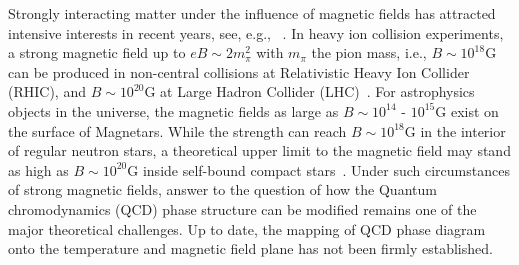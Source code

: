 \documentclass[12pt]{article}
\begin{document}
Strongly interacting matter under the influence of magnetic fields has attracted intensive interests
in recent years, see, e.g., ~\cite{andersen2016phase,kharzeev2013strongly,miransky2015quantum}.
In heavy ion collision experiments, a strong magnetic field up to $eB \sim 2m_{\pi}^2$ with $m_{\pi}$
the pion mass, i.e., $B \sim 10^{18}\text{G}$ can be produced in non-central collisions at Relativistic Heavy
Ion Collider (RHIC), and $B \sim 10^{20}\text{G}$ at Large Hadron Collider (LHC)~\cite{kharzeev2008,skokov2009}.
For astrophysics objects in the universe, the magnetic fields as large as
$B \sim 10^{14}$ - $10^{15}\text{G}$ exist on the surface of Magnetars. While the strength
can reach $B \sim 10^{18}\text{G}$ in the interior of regular neutron stars, a theoretical upper limit to the magnetic field may stand as high as $B \sim 10^{20}\text{G}$ inside self-bound compact stars~\cite{dong2001,lai1991cold}.
Under such circumstances of strong magnetic fields,
answer to the question of how the Quantum chromodynamics (QCD) phase structure can be modified remains
one of the major theoretical challenges.
Up to date, the mapping of QCD phase diagram onto the temperature and
magnetic field plane has not been firmly established.
\end{document}
